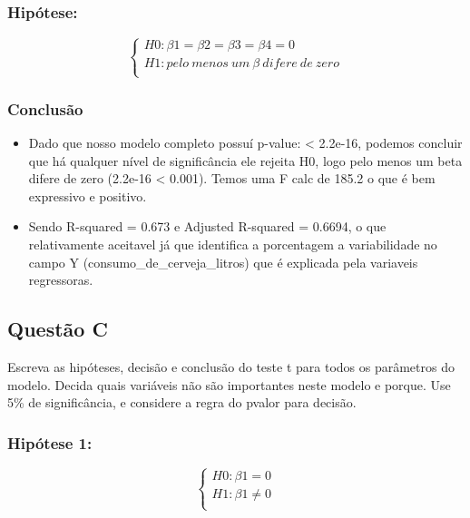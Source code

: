 \documentclass[
]{article}
\providecommand{\tightlist}{%
  \setlength{\itemsep}{0pt}\setlength{\parskip}{0pt}}
\begin{document}
\hypertarget{hipuxf3tese}{%
\subsubsection{Hipótese:}\label{hipuxf3tese}}

\[
\left\{ \begin{array}{rc} 
H0: \beta1 = \beta2 = \beta3 = \beta4 = 0 \\ 
H1: pelo \ menos \ um \ \beta \ difere \ de \ zero \\ 
\end{array}\right.
\]

\hypertarget{conclusuxe3o-1}{%
\subsubsection{Conclusão}\label{conclusuxe3o-1}}

\begin{itemize}
\tightlist
\item
  Dado que nosso modelo completo possuí p-value: \textless{} 2.2e-16,
  podemos concluir que há qualquer nível de significância ele rejeita
  H0, logo pelo menos um beta difere de zero (2.2e-16 \textless{}
  0.001). Temos uma F calc de 185.2 o que é bem expressivo e positivo.
\item
  Sendo R-squared = 0.673 e Adjusted R-squared = 0.6694, o que
  relativamente aceitavel já que identifica a porcentagem a
  variabilidade no campo Y (consumo\_de\_cerveja\_litros) que é
  explicada pela variaveis regressoras.
\end{itemize}

\hypertarget{questuxe3o-c}{%
\subsection{Questão C}\label{questuxe3o-c}}

Escreva as hipóteses, decisão e conclusão do teste t para todos os
parâmetros do modelo. Decida quais variáveis não são importantes neste
modelo e porque. Use 5\% de significância, e considere a regra do pvalor
para decisão.

\hypertarget{hipuxf3tese-1}{%
\subsubsection{Hipótese 1:}\label{hipuxf3tese-1}}

\[
\left\{ \begin{array}{rc} 
H0: \beta1 = 0 \\ 
H1: \beta1 \neq 0 \\ 
\end{array}\right.
\]
\end{document}

